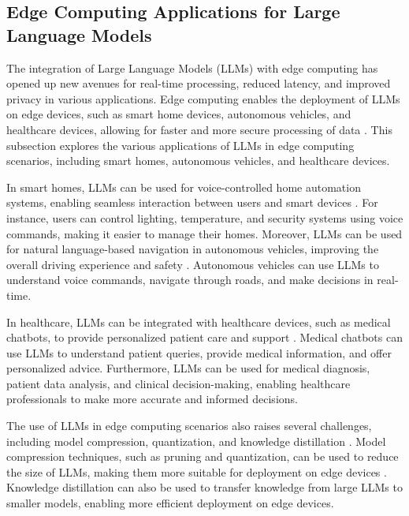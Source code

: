 \documentclass[11pt,a4paper]{article}
\begin{document}
\subsection{Edge Computing Applications for Large Language Models}


The integration of Large Language Models (LLMs) with edge computing has opened up new avenues for real-time processing, reduced latency, and improved privacy in various applications. Edge computing enables the deployment of LLMs on edge devices, such as smart home devices, autonomous vehicles, and healthcare devices, allowing for faster and more secure processing of data \cite{doi:10.1109/comst.2025.3527641}. This subsection explores the various applications of LLMs in edge computing scenarios, including smart homes, autonomous vehicles, and healthcare devices.

In smart homes, LLMs can be used for voice-controlled home automation systems, enabling seamless interaction between users and smart devices \cite{doi:10.1145/3466752.3480095}. For instance, users can control lighting, temperature, and security systems using voice commands, making it easier to manage their homes. Moreover, LLMs can be used for natural language-based navigation in autonomous vehicles, improving the overall driving experience and safety \cite{doi:10.1109/mnet.2024.3435752}. Autonomous vehicles can use LLMs to understand voice commands, navigate through roads, and make decisions in real-time.

In healthcare, LLMs can be integrated with healthcare devices, such as medical chatbots, to provide personalized patient care and support \cite{doi:10.1109/mnet.2025.3539338}. Medical chatbots can use LLMs to understand patient queries, provide medical information, and offer personalized advice. Furthermore, LLMs can be used for medical diagnosis, patient data analysis, and clinical decision-making, enabling healthcare professionals to make more accurate and informed decisions.

The use of LLMs in edge computing scenarios also raises several challenges, including model compression, quantization, and knowledge distillation \cite{arxiv:2404.14294}. Model compression techniques, such as pruning and quantization, can be used to reduce the size of LLMs, making them more suitable for deployment on edge devices \cite{doi:10.1609/aaai.v37i9.26255}. Knowledge distillation can also be used to transfer knowledge from large LLMs to smaller models, enabling more efficient deployment on edge devices.
\end{document}
